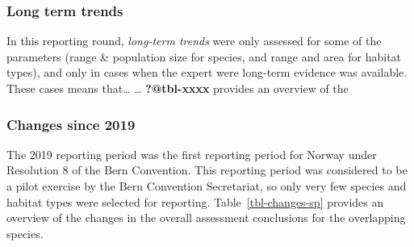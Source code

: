 \documentclass[
  letterpaper,
  DIV=11,
  numbers=noendperiod]{scrartcl}
\begin{document}
\subsubsection{Long term trends}\label{long-term-trends}

In this reporting round, \emph{long-term trends} were only assessed for
some of the parameters (range \& population size for species, and range
and area for habitat types), and only in cases when the expert were
long-term evidence was available. These cases means that\ldots{}
\ldots{} \textbf{?@tbl-xxxx} provides an overview of the

\subsubsection{Changes since 2019}\label{changes-since-2019}

The 2019 reporting period was the first reporting period for Norway
under Resolution 8 of the Bern Convention. This reporting period was
considered to be a pilot exercise by the Bern Convention Secretariat, so
only very few species and habitat types were selected for reporting.
Table~\ref{tbl-changes-sp} provides an overview of the changes in the
overall assessment conclusions for the overlapping species.

\begin{table}

\caption{\label{tbl-changes-sp}}


\end{table}%
\end{document}
